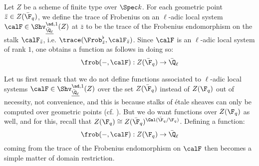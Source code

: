 \begin{definition} \label{def: traces_of_frobenii}
            Let $Z$ be a scheme of finite type over $\Spec k$. For each geometric point $\bar{z} \in Z(\bar{\F}_q)$, we define the trace of Frobenius on an $\ell$-adic local system $\calF \in \Shv_{\underline{\bar{\Q}_{\ell}}}^{\ad, 1}(Z)$ at $\bar{z}$ to be the trace of the Frobenius endomorphism on the stalk $\calF_{\bar{z}}$, i.e. $\trace(\Frob_{\bar{z}}^{\flat}, \calF_{\bar{z}})$. Since $\calF$ is an $\ell$-adic local system of rank $1$, one obtains a function as follows in doing so:
                $$\frob(-, \calF): Z(\bar{\F}_q) \to \bar{\Q}_{\ell}$$
        \end{definition}
        \begin{remark} \label{remark: traces_of_frobenii_as_functions_on_rational_points}
            Let us first remark that we do not define functions associated to $\ell$-adic local systems $\calF \in \Shv_{\underline{\bar{\Q}_{\ell}}}^{\ad, 1}(Z)$ over the set $Z(\bar{\F}_q)$ instead of $Z(\F_q)$ out of necessity, not convenience, and this is because stalks of \'etale sheaves can only be computed over geometric points (cf. \cite[\href{https://stacks.math.columbia.edu/tag/03PN}{Tag 03PN}]{stacks}). But we do want functions over $Z(\F_q)$ as well, and for this, recall that $Z(\F_q) \cong Z(\bar{\F}_q)^{\Gal(\bar{\F}_q/\F_q)}$. Defining a function:
                $$\frob(-, \calF): Z(\F_q) \to \bar{\Q}_{\ell}$$
            coming from the trace of the Frobenius endomorphism on $\calF$ then becomes a simple matter of domain restriction.
        \end{remark}
